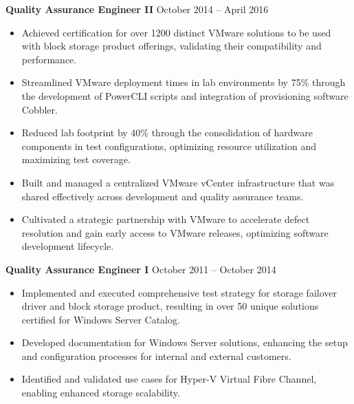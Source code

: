 \documentclass[11pt]{article}       %
\begin{document}
\textbf{Quality Assurance Engineer II} \hfill October 2014 – April 2016 \\
\vspace{-9pt}
\begin{itemize}
  \item Achieved certification for over 1200 distinct VMware solutions to be used with block storage product offerings, validating their compatibility and performance.
  \item Streamlined VMware deployment times in lab environments by 75\% through the development of PowerCLI scripts and integration of provisioning software Cobbler.
  \item Reduced lab footprint by 40\% through the consolidation of hardware components in test configurations, optimizing resource utilization and maximizing test coverage.
  \item Built and managed a centralized VMware vCenter infrastructure that was shared effectively across development and quality assurance teams.
  \item Cultivated a strategic partnership with VMware to accelerate defect resolution and gain early access to VMware releases, optimizing software development lifecycle.
\end{itemize}

\textbf{Quality Assurance Engineer I} \hfill October 2011 – October 2014 \\
\vspace{-9pt}
\begin{itemize}
  \item Implemented and executed comprehensive test strategy for storage failover driver and block storage product, resulting in over 50 unique solutions certified for Windows Server Catalog.
  \item Developed documentation for Windows Server solutions, enhancing the setup and configuration processes for internal and external customers.
  \item Identified and validated use cases for Hyper-V Virtual Fibre Channel, enabling enhanced storage scalability.
\end{itemize}

\end{document}
